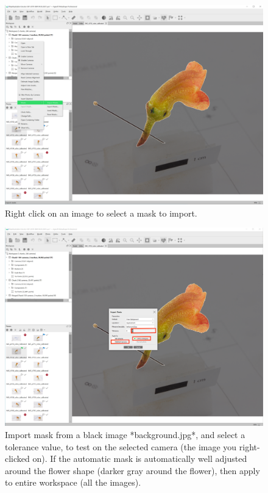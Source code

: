 \documentclass[
]{book}
\begin{document}
\begin{figure}

{\centering \includegraphics[width=1\linewidth]{Figures/Metashape_mask_right_click} 

}

\caption{Right click on an image to select a mask to import.}\label{fig:Metashapemasksrightclick}
\end{figure}

\begin{figure}

{\centering \includegraphics[width=1\linewidth]{Figures/Metashape_masks_tolerance} 

}

\caption{Import mask from a black image *background.jpg*, and select a tolerance value, to test on the selected camera (the image you right-clicked on). If the automatic mask is automatically well adjusted around the flower shape (darker gray around the flower), then apply to entire workspace (all the images).}\label{fig:Metashapemaskstolerance}
\end{figure}
\end{document}
